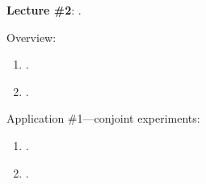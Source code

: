 \documentclass[letterpaper]{article}\usepackage[]{graphicx}\usepackage[svgnames]{xcolor}
\renewenvironment{itemize}{
  \begin{list}{}{
    \setlength{\leftmargin}{1.5em}
  }
}{
  \end{list}
}
\begin{document}
\begin{enumerate}
\begin{itemize}
      \end{itemize}



	\item {\bf Lecture \#2}: {\color{ForestGreen}{\bf Survey Experiments: Conjoint and List Designs}}.

			\begin{itemize} 

        \item[$\diamond$] Overview:

        \begin{enumerate}

          \item[$\bullet$] \href{https://www.cambridge.org/core/product/identifier/S1047198700006343/type/journal_article}{}.

          \item[$\bullet$] \href{https://www.cambridge.org/core/product/identifier/S2052263015000196/type/journal_article}{}.

        \end{enumerate}

       \item[$\diamond$] Application \#1---conjoint experiments:

           \begin{enumerate}


           \item[$\bullet$] \href{https://www.cambridge.org/core/product/identifier/S1047198700013589/type/journal_article}{}.


           \item[$\bullet$] \href{https://doi.org/10.1017/pan.2019.30}{}.

        


\end{enumerate}
\end{itemize}
\end{enumerate}
\end{document}
